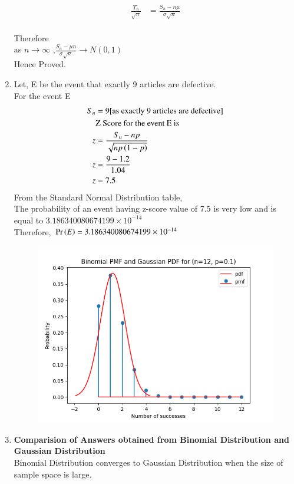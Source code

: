 \documentclass[journal,12pt,twocolumn]{IEEEtran}
\begin{document}
\begin{enumerate}[label=(\Roman*), align=left]
\begin{align}
    \frac{T_n}{\sqrt{n}}&= \frac{S_n-n\mu}{\sigma{\sqrt{n}}}
    \end{align}
\\Therefore
\\ as $n \to \infty$ ,$\frac{S_n -\mu{n}}{\sigma{\sqrt{n}}} \to N(0,1)$
\\Hence Proved.
\item
 Let, E be the event that exactly 9 articles are defective.
 \\For the event E
 \begin{align}
    S_n &= 9 \text{[as exactly 9 articles are defective]}\nonumber\\
    &\text{Z Score for the event E is} \nonumber\\
    z &= \frac{S_n-np}{\sqrt{np\left(1-p\right)}}\\
    z &= \frac{9-1.2}{1.04}\nonumber\\
    z &= 7.5
    \end{align}
From the Standard Normal Distribution table,
\\The probability of an event having z-score value of 7.5 is very low and is equal to $3.186340080674199 \times 10^{-14}$
\\Therefore, $\Pr\left(E\right) = 3.186340080674199 \times 10^{-14}$
\begin{figure}[h]
\centering
\includegraphics[width=\columnwidth]{./figs/graph.png}
\end{figure}
\item
\textbf{Comparision of Answers obtained from Binomial Distribution and Gaussian Distribution}
\\Binomial Distribution converges to Gaussian Distribution when the size of sample space is large.

\end{enumerate}
\end{document}
